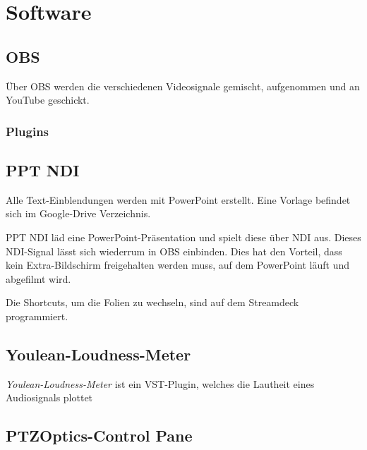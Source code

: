 \chapter{Software}
	\section{OBS}
		Über \Gls{OBS} werden die verschiedenen Videosignale gemischt, aufgenommen und an YouTube geschickt.
	
		\subsection{Plugins}
	\section{PPT NDI}
		Alle Text-Einblendungen werden mit PowerPoint erstellt. Eine Vorlage befindet sich im Google-Drive Verzeichnis.

		PPT NDI läd eine PowerPoint-Präsentation und spielt diese über \Gls{NDI} aus. Dieses \Gls{NDI}-Signal lässt sich wiederrum in \Gls{OBS} einbinden. Dies hat den Vorteil, dass kein Extra-Bildschirm freigehalten werden muss, auf dem PowerPoint läuft und abgefilmt wird.

		Die Shortcuts, um die Folien zu wechseln, sind auf dem Streamdeck programmiert.
	\section{Youlean-Loudness-Meter}
		\textit{Youlean-Loudness-Meter} ist ein \Gls{VST-Plugin}, welches die \Gls{Lautheit} eines Audiosignals plottet
	\section{PTZOptics-Control Pane}